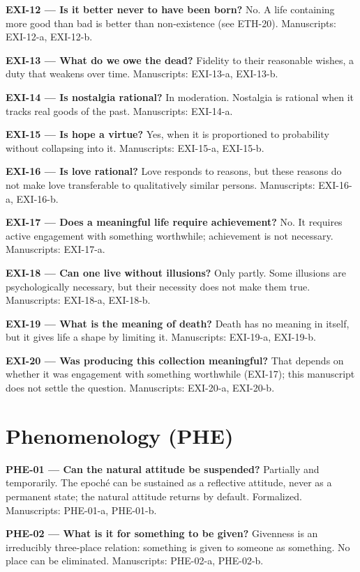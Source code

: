 \documentclass[10pt]{article}
\begin{document}
\textbf{EXI-12 --- Is it better never to have been born?} No. A life containing more good than bad is better than non-existence (see ETH-20). Manuscripts: EXI-12-a, EXI-12-b.

\textbf{EXI-13 --- What do we owe the dead?} Fidelity to their reasonable wishes, a duty that weakens over time. Manuscripts: EXI-13-a, EXI-13-b.

\textbf{EXI-14 --- Is nostalgia rational?} In moderation. Nostalgia is rational when it tracks real goods of the past. Manuscripts: EXI-14-a.

\textbf{EXI-15 --- Is hope a virtue?} Yes, when it is proportioned to probability without collapsing into it. Manuscripts: EXI-15-a, EXI-15-b.

\textbf{EXI-16 --- Is love rational?} Love responds to reasons, but these reasons do not make love transferable to qualitatively similar persons. Manuscripts: EXI-16-a, EXI-16-b.

\textbf{EXI-17 --- Does a meaningful life require achievement?} No. It requires active engagement with something worthwhile; achievement is not necessary. Manuscripts: EXI-17-a.

\textbf{EXI-18 --- Can one live without illusions?} Only partly. Some illusions are psychologically necessary, but their necessity does not make them true. Manuscripts: EXI-18-a, EXI-18-b.

\textbf{EXI-19 --- What is the meaning of death?} Death has no meaning in itself, but it gives life a shape by limiting it. Manuscripts: EXI-19-a, EXI-19-b.

\textbf{EXI-20 --- Was producing this collection meaningful?} That depends on whether it was engagement with something worthwhile (EXI-17); this manuscript does not settle the question. Manuscripts: EXI-20-a, EXI-20-b.

\section*{Phenomenology (PHE)}
\textbf{PHE-01 --- Can the natural attitude be suspended?} Partially and temporarily. The epoché can be sustained as a reflective attitude, never as a permanent state; the natural attitude returns by default. Formalized. Manuscripts: PHE-01-a, PHE-01-b.

\textbf{PHE-02 --- What is it for something to be given?} Givenness is an irreducibly three-place relation: something is given to someone as something. No place can be eliminated. Manuscripts: PHE-02-a, PHE-02-b.
\end{document}
